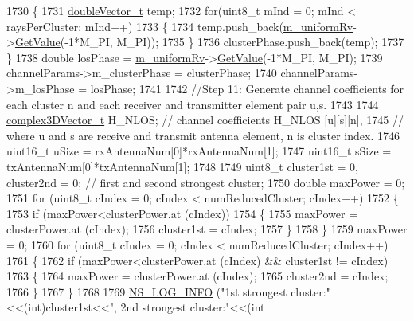 \begin{DoxyCode}
1730         \{
1731                 \hyperlink{namespacens3_aa6f1edf6566ca6afec613bc6e40240ea}{doubleVector\_t} temp;
1732                 \textcolor{keywordflow}{for}(uint8\_t mInd = 0; mInd < raysPerCluster; mInd++)
1733                 \{
1734                         temp.push\_back(\hyperlink{classns3_1_1MmWave3gppChannel_ac6493e4d80b717378e74a63d418f8c6f}{m\_uniformRv}->\hyperlink{classns3_1_1UniformRandomVariable_a03822d8c86ac51e9aa83bbc73041386b}{GetValue}(-1*M\_PI, M\_PI));
1735                 \}
1736                 clusterPhase.push\_back(temp);
1737         \}
1738         \textcolor{keywordtype}{double} losPhase = \hyperlink{classns3_1_1MmWave3gppChannel_ac6493e4d80b717378e74a63d418f8c6f}{m\_uniformRv}->\hyperlink{classns3_1_1UniformRandomVariable_a03822d8c86ac51e9aa83bbc73041386b}{GetValue}(-1*M\_PI, M\_PI);
1739         channelParams->m\_clusterPhase = clusterPhase;
1740         channelParams->m\_losPhase = losPhase;
1741 
1742         \textcolor{comment}{//Step 11: Generate channel coefficients for each cluster n and each receiver and transmitter
       element pair u,s.}
1743 
1744         \hyperlink{namespacens3_afbc512ea4e4657e80b7ac44f78fc81ad}{complex3DVector\_t} H\_NLOS; \textcolor{comment}{// channel coefficients H\_NLOS [u][s][n],}
1745                                                           \textcolor{comment}{// where u and s are receive and transmit antenna
       element, n is cluster index.}
1746         uint16\_t uSize = rxAntennaNum[0]*rxAntennaNum[1];
1747         uint16\_t sSize = txAntennaNum[0]*txAntennaNum[1];
1748 
1749         uint8\_t cluster1st = 0, cluster2nd = 0; \textcolor{comment}{// first and second strongest cluster;}
1750         \textcolor{keywordtype}{double} maxPower = 0;
1751         \textcolor{keywordflow}{for} (uint8\_t cIndex = 0; cIndex < numReducedCluster; cIndex++)
1752         \{
1753                 \textcolor{keywordflow}{if} (maxPower<clusterPower.at (cIndex))
1754                 \{
1755                         maxPower = clusterPower.at (cIndex);
1756                         cluster1st = cIndex;
1757                 \}
1758         \}
1759         maxPower = 0;
1760         \textcolor{keywordflow}{for} (uint8\_t cIndex = 0; cIndex < numReducedCluster; cIndex++)
1761         \{
1762                 \textcolor{keywordflow}{if} (maxPower<clusterPower.at (cIndex) && cluster1st != cIndex)
1763                 \{
1764                         maxPower = clusterPower.at (cIndex);
1765                         cluster2nd = cIndex;
1766                 \}
1767         \}
1768 
1769         \hyperlink{group__logging_gafbd73ee2cf9f26b319f49086d8e860fb}{NS\_LOG\_INFO} (\textcolor{stringliteral}{"1st strongest cluster:"}<<(\textcolor{keywordtype}{int})cluster1st<<\textcolor{stringliteral}{", 2nd strongest cluster:"}<<(\textcolor{keywordtype}{int}

\end{DoxyCode}
